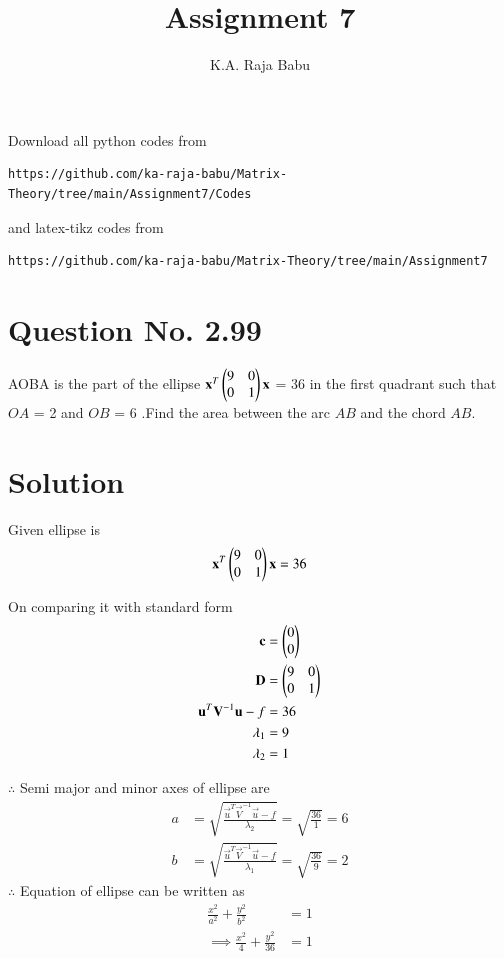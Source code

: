 \documentclass[journal,12pt,twocolumn]{IEEEtran}
\begin{document}
     \def\rightbox#1{\makebox[0in][r]{#1}}
     \def\centbox#1{\makebox[0in]{#1}}
     \def\topbox#1{\raisebox{-\baselineskip}[0in][0in]{#1}}
     \def\midbox#1{\raisebox{-0.5\baselineskip}[0in][0in]{#1}}
\vspace{3cm}
\title{Assignment 7}
\author{K.A. Raja Babu}
\maketitle
\newpage
\bigskip
\renewcommand{\thefigure}{\theenumi}
\renewcommand{\thetable}{\theenumi}
Download all python codes from 
\begin{lstlisting}
https://github.com/ka-raja-babu/Matrix-Theory/tree/main/Assignment7/Codes
\end{lstlisting}
%
and latex-tikz codes from 
%
\begin{lstlisting}
https://github.com/ka-raja-babu/Matrix-Theory/tree/main/Assignment7
\end{lstlisting}
%
\section{Question No. 2.99}
AOBA is the part of the ellipse $\mathbf{x}^T\begin{pmatrix}9 & 0 \\ 0 & 1\end{pmatrix}\mathbf{x}$ = 36 in the first quadrant such that $OA$ = 2 and $OB$ = 6 .Find the area between the arc $AB$ and the chord $AB$.
%
\section{Solution}
Given ellipse is 
\begin{align}
    \mathbf{x}^T\begin{pmatrix}9 & 0 \\ 0 & 1\end{pmatrix}\mathbf{x} = 36 
\end{align}

On comparing it with standard form
\begin{align}
    \mathbf{c} &= \begin{pmatrix}0 \\ 0\end{pmatrix}
    \\
    \mathbf{D} &= \begin{pmatrix}9 & 0 \\ 0 & 1\end{pmatrix}
    \\
    \mathbf{u}^T\mathbf{V}^{-1}\mathbf{u} - f &= 36
    \\
    \lambda_1 &= 9 
    \\
    \lambda_2 &= 1
\end{align}

$\therefore$  Semi major and minor axes of ellipse are
\begin{align}
    a &= \sqrt{\frac{ \vec{u}^T\vec{V}^{-1}\vec{u} - f}{\lambda_2}} = \sqrt{\frac{36}{1}} = 6
    \\
    b &= \sqrt{\frac{ \vec{u}^T\vec{V}^{-1}\vec{u} - f}{\lambda_1}} = \sqrt{\frac{36}{9}} = 2
\end{align}
$\therefore$ Equation of ellipse can be written as
\begin{align}
    \frac{x^2}{a^2} + \frac{y^2}{b^2} &= 1
    \\
    \implies \frac{x^2}{4} + \frac{y^2}{36} &= 1
\end{align}
\end{document}
